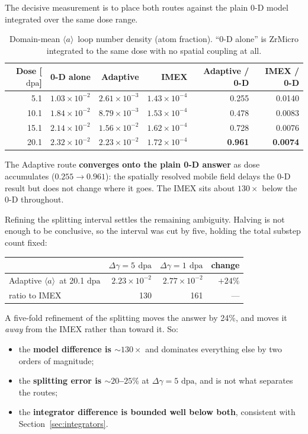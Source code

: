 \documentclass[11pt,a4paper]{article}
\newcommand{\dpa}{\ensuremath{\mathrm{dpa}}}
\newcommand{\aloop}{\ensuremath{\langle a\rangle}}
\begin{document}
The decisive measurement is to place both routes against the plain 0-D model
integrated over the same dose range.

\begin{table}[htb]
\centering
\caption{Domain-mean \aloop\ loop number density (atom fraction). ``0-D alone''
is ZrMicro integrated to the same dose with no spatial coupling at all.}
\label{tab:attrib}
\begin{tabular}{rrrrrr}
\toprule
Dose [\dpa] & 0-D alone & Adaptive & IMEX & Adaptive / 0-D & IMEX / 0-D \\
\midrule
 5.1 & $1.03\times10^{-2}$ & $2.61\times10^{-3}$ & $1.43\times10^{-4}$ & 0.255 & 0.0140 \\
10.1 & $1.84\times10^{-2}$ & $8.79\times10^{-3}$ & $1.53\times10^{-4}$ & 0.478 & 0.0083 \\
15.1 & $2.14\times10^{-2}$ & $1.56\times10^{-2}$ & $1.62\times10^{-4}$ & 0.728 & 0.0076 \\
20.1 & $2.32\times10^{-2}$ & $2.23\times10^{-2}$ & $1.72\times10^{-4}$ & \textbf{0.961} & \textbf{0.0074} \\
\bottomrule
\end{tabular}
\end{table}

The Adaptive route \textbf{converges onto the plain 0-D answer} as dose
accumulates ($0.255 \to 0.961$): the spatially resolved mobile field delays the
0-D result but does not change where it goes. The IMEX sits about
$130\times$ below the 0-D throughout.

Refining the splitting interval settles the remaining ambiguity. Halving is not
enough to be conclusive, so the interval was cut by five, holding the total
substep count fixed:

\begin{center}
\begin{tabular}{lrrr}
\toprule
& $\Delta\gamma = 5$ \dpa & $\Delta\gamma = 1$ \dpa & change \\
\midrule
Adaptive \aloop\ at 20.1 \dpa & $2.23\times10^{-2}$ & $2.77\times10^{-2}$ & $+24\%$ \\
ratio to IMEX          & 130 & 161 & --- \\
\bottomrule
\end{tabular}
\end{center}

A five-fold refinement of the splitting moves the answer by 24\%, and moves it
\emph{away} from the IMEX rather than toward it. So:

\begin{itemize}
\item the \textbf{model difference is ${\sim}130\times$} and dominates
      everything else by two orders of magnitude;
\item the \textbf{splitting error is ${\sim}20$--$25\%$} at $\Delta\gamma = 5$
      \dpa, and is not what separates the routes;
\item the \textbf{integrator difference is bounded well below both}, consistent
      with Section~\ref{sec:integrators}.
\end{itemize}
\end{document}
